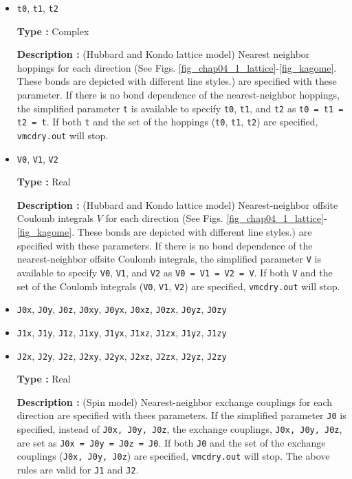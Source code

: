 \begin{itemize}
\item \verb|t0|,  \verb|t1|, \verb|t2|

{\bf Type :} Complex

{\bf Description :} (Hubbard and Kondo lattice model)
Nearest neighbor hoppings for each direction
(See Figs. \ref{fig_chap04_1_lattice}-\ref{fig_kagome}.
These bonds are depicted with different line styles.)
are specified with these parameter.
If there is no bond dependence of the nearest-neighbor hoppings,
the simplified parameter \verb|t| is available to specify \verb|t0|,  \verb|t1|, and \verb|t2| as
\verb|t0 = t1 = t2 = t|.
If both \verb|t| and the set of the hoppings (\verb|t0|,  \verb|t1|, \verb|t2|) are specified,
\verb|vmcdry.out| will stop.

\item \verb|V0|,  \verb|V1|, \verb|V2|

{\bf Type :} Real

{\bf Description :} (Hubbard and Kondo lattice model)
Nearest-neighbor offsite Coulomb integrals $V$
 for each direction
 (See Figs. \ref{fig_chap04_1_lattice}-\ref{fig_kagome}.
 These bonds are depicted with different line styles.)
are specified with these parameters.
If there is no bond dependence of the nearest-neighbor offsite Coulomb integrals,
the simplified parameter \verb|V| is available to specify \verb|V0|,  \verb|V1|, and \verb|V2| as
\verb|V0 = V1 = V2 = V|.
If both \verb|V| and the set of the Coulomb integrals (\verb|V0|,  \verb|V1|, \verb|V2|) are specified,
\verb|vmcdry.out| will stop.

\item \verb|J0x|, \verb|J0y|, \verb|J0z|, \verb|J0xy|, 
  \verb|J0yx|, \verb|J0xz|, \verb|J0zx|, \verb|J0yz|, \verb|J0zy|
\item \verb|J1x|, \verb|J1y|, \verb|J1z|, \verb|J1xy|, 
  \verb|J1yx|, \verb|J1xz|, \verb|J1zx|, \verb|J1yz|, \verb|J1zy|
\item \verb|J2x|, \verb|J2y|, \verb|J2z|, \verb|J2xy|, 
  \verb|J2yx|, \verb|J2xz|, \verb|J2zx|, \verb|J2yz|, \verb|J2zy|

{\bf Type :} Real

{\bf Description :} (Spin model)
Nearest-neighbor exchange couplings for each direction
are specified with thees parameters.
If the simplified parameter \verb|J0| is specified, instead of \verb|J0x, J0y, J0z|,
the exchange couplings, \verb|J0x, J0y, J0z|, are set as \verb|J0x = J0y = J0z = J0|.
If both \verb|J0| and the set of the exchange couplings (\verb|J0x, J0y, J0z|)
are specified, \verb|vmcdry.out| will stop.
The above rules are valid for \verb|J1| and \verb|J2|.


\end{itemize}
